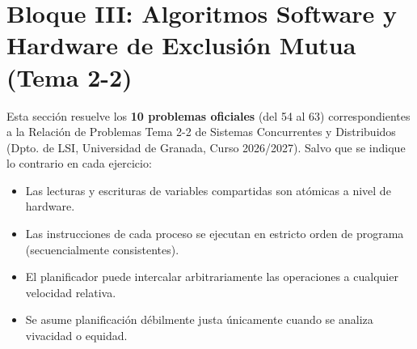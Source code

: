 \section{Bloque III: Algoritmos Software y Hardware de Exclusión Mutua (Tema 2-2)}

\begin{aviso}
Esta sección resuelve los \textbf{10 problemas oficiales} (del 54 al 63) correspondientes a la Relación de Problemas Tema 2-2 de Sistemas Concurrentes y Distribuidos (Dpto. de LSI, Universidad de Granada, Curso 2026/2027).
Salvo que se indique lo contrario en cada ejercicio:
\begin{itemize}[leftmargin=*,noitemsep]
    \item Las lecturas y escrituras de variables compartidas son atómicas a nivel de hardware.
    \item Las instrucciones de cada proceso se ejecutan en estricto orden de programa (secuencialmente consistentes).
    \item El planificador puede intercalar arbitrariamente las operaciones a cualquier velocidad relativa.
    \item Se asume planificación débilmente justa únicamente cuando se analiza vivacidad o equidad.
\end{itemize}
\end{aviso}

